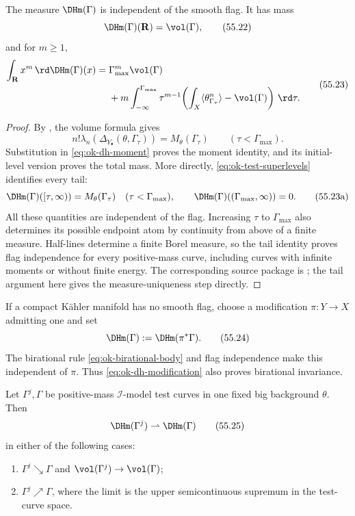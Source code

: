 \begin{theorem}\label{thm:ok-dh-flag-independent}
The measure $\DHm(\Gamma)$ is independent of the smooth flag.
It has mass
\[
                         \DHm(\Gamma)(\mathbf R)=\vol(\Gamma),
\tag{55.22}\label{eq:ok-dh-total-mass}
\]
and for $m\geq1$,
\[
\begin{split}
 \int_{\mathbf R}x^m\,\rd \DHm(\Gamma)(x)
 ={}&\Gamma_{\max}^m\vol(\Gamma)\\
 &+m\int_{-\infty}^{\Gamma_{\max}}
 \tau^{m-1}\!
 \left(\int_X\langle\theta_{\Gamma_\tau}^n\rangle
                  -\vol(\Gamma)\right)\,\rd\tau .
\end{split}
\tag{55.23}\label{eq:ok-intrinsic-moments}
\]
\end{theorem}

\begin{proof}
By , the volume formula gives
\[
 n!\lambda_n(\Delta_{Y_\bullet}(\theta,\Gamma_\tau))
 =M_\theta(\Gamma_\tau)\qquad(\tau<\Gamma_{\max}).
\]
Substitution in \eqref{eq:ok-dh-moment} proves the moment identity, and
its initial-level version proves the total mass.
More directly, \eqref{eq:ok-test-superlevels} identifies every tail:
\[
 \DHm(\Gamma)([\tau,\infty))=M_\theta(\Gamma_\tau)
       \quad(\tau<\Gamma_{\max}),\qquad
 \DHm(\Gamma)((\Gamma_{\max},\infty))=0.
\tag{55.23a}\label{eq:ok-intrinsic-tail}
\]
All these quantities are independent of the flag.  Increasing $\tau$ to
$\Gamma_{\max}$ also determines its possible endpoint atom by continuity
from above of a finite measure.  Half-lines determine a finite Borel measure,
so the tail identity proves flag independence for every positive-mass curve,
including curves with infinite moments or without finite energy.
The corresponding source package is
\cite[Theorem~13.3.1]{XiaBook}; the tail argument here gives the
measure-uniqueness step directly.
\end{proof}

If a compact K\"ahler manifold has no smooth flag, choose a modification
$\pi:Y\to X$ admitting one and set
\[
                         \DHm(\Gamma):=\DHm(\pi^*\Gamma).
\tag{55.24}\label{eq:ok-dh-modification}
\]
The birational rule \eqref{eq:ok-birational-body} and flag independence make
this independent of $\pi$.
Thus \eqref{eq:ok-dh-modification} also proves birational invariance.

\begin{proposition}\label{prop:ok-dh-weak-continuity}
Let $\Gamma^j,\Gamma$ be positive-mass $\mathcal I$-model test curves
in one fixed big background $\theta$.
Then
\[
                    \DHm(\Gamma^j)\rightharpoonup\DHm(\Gamma)
\tag{55.25}\label{eq:ok-dh-weak}
\]
in either of the following cases:
\begin{enumerate}
\item $\Gamma^j\searrow\Gamma$ and
$\vol(\Gamma^j)\to\vol(\Gamma)$;
\item $\Gamma^j\nearrow\Gamma$, where the limit is the upper
semicontinuous supremum in the test-curve space.
\end{enumerate}
\par
\end{proposition}

